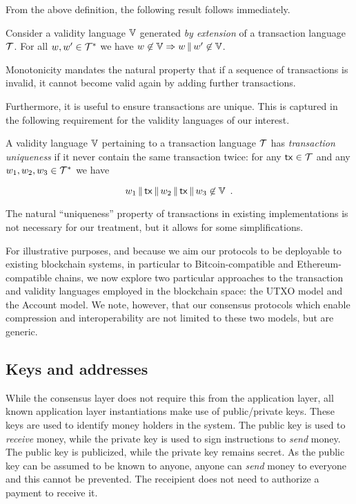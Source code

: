 From the above definition, the following result follows immediately.

\begin{lemma}
  Consider a validity language $\mathbb{V}$ generated \emph{by extension} of a
  transaction language $\mathcal{T}$. For all $w,w'\in \mathcal{T}^*$ we have
  $w\not\in\mathbb{V} \Rightarrow w\,\|\, w'\not\in\mathbb{V}$.
\end{lemma}

Monotonicity mandates the natural property that if a sequence of transactions is
invalid, it cannot become valid again by adding further transactions.

Furthermore, it is useful to ensure transactions are unique. This is captured in
the following requirement for the validity languages of our interest.

\begin{definition}\label{def:trans-uniqueness}
  A validity language $\mathbb{V}$ pertaining to a transaction language $\mathcal{T}$
  has \emph{transaction uniqueness} if it never contain the same transaction
  twice: for any $\mathsf{tx}\in \mathcal{T}$ and any
  $w_1,w_2,w_3\in \mathcal{T}^*$ we have

  \[ w_1\,\|\,\mathsf{tx}\,\|\,
  w_2\,\|\,\mathsf{tx}\,\|\, w_3\not\in\mathbb{V} \,~. \]
\end{definition}

The natural ``uniqueness'' property of transactions in existing implementations
is not necessary for our treatment, but it allows for some simplifications.

For illustrative purposes, and because we aim our protocols to be deployable to
existing blockchain systems, in particular to Bitcoin-compatible and
Ethereum-compatible chains, we now explore two particular approaches to the
transaction and validity languages employed in the blockchain space: the UTXO
model and the Account model. We note, however, that our consensus protocols
which enable compression and interoperability are not limited to these two
models, but are generic.

\subsection{Keys and addresses}
While the consensus layer does not require this from the application layer,
all known application layer instantiations make use of public/private keys.
These keys are used to identify money holders in the system. The public key is
used to \emph{receive} money, while the private key is used to sign instructions
to \emph{send} money. The public key is publicized, while the private key
remains secret. As the public key can be assumed to be known to anyone, anyone
can \emph{send} money to everyone and this cannot be prevented. The receipient
does not need to authorize a payment to receive it.

